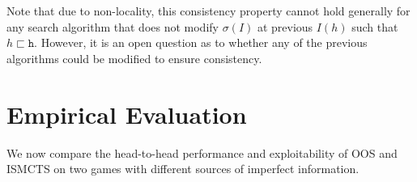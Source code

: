 \documentclass[letterpaper]{article}
\newcommand{\tth}{\mathtt{h}}
\newcounter{mlNoteCounter}
\newcommand{\mlnote}[1]{{\scriptsize \color{darkgreen} $\blacksquare$ \refstepcounter{mlNoteCounter}\textsf{[ML]$_{\arabic{mlNoteCounter}}$:{#1}}}}
\begin{document}
Note that due to non-locality, this consistency property cannot hold generally for any search 
algorithm that does not modify $\sigma(I)$ at previous $I(h)$ such that $h \sqsubset \tth$. However, 
it is an open question as to whether any of the previous algorithms could be modified to ensure 
consistency.

\section{Empirical Evaluation}


%

We now compare the head-to-head performance and exploitability 
of OOS and ISMCTS on two games with different sources of imperfect information. 
\end{document}
